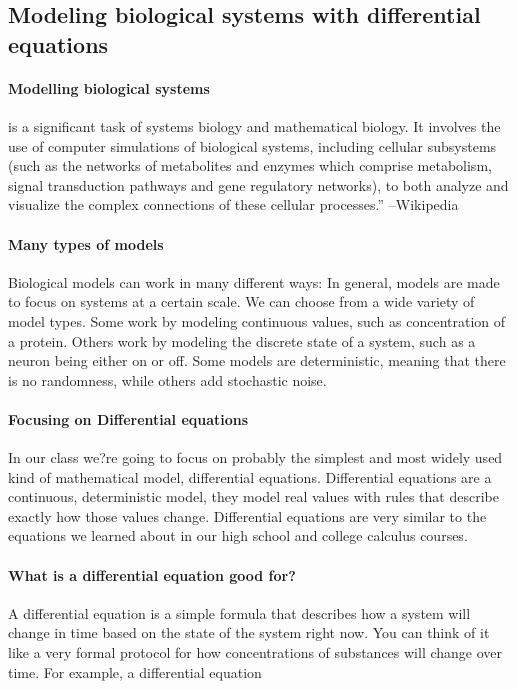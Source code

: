 


\subsection{Modeling biological systems with differential equations}
\paragraph{Modelling biological systems} is a significant task of systems biology and mathematical biology. It involves the use of computer simulations of biological systems, including cellular subsystems (such as the networks of metabolites and enzymes which comprise metabolism, signal transduction pathways and gene regulatory networks), to both analyze and visualize the complex connections of these cellular processes.'' --Wikipedia

\paragraph{Many types of models} Biological models can work in many different ways:  In general, models are made to focus on systems at a certain scale.  We can choose from a wide variety of model types. Some work by modeling continuous values, such as concentration of a protein.  Others work by modeling the discrete state of a system, such as a neuron being either on or off.  Some models are deterministic, meaning that there is no randomness, while others add stochastic noise.

\paragraph{Focusing on Differential equations} In our class we?re going to focus on probably the simplest and most widely used kind of mathematical model, differential equations.  Differential equations are a continuous, deterministic model, they model real values with rules that describe exactly how those values change.  Differential equations are very similar to the equations we learned about in our high school and college calculus courses.

\paragraph{What is a differential equation good for?} A differential equation is a simple formula that describes how a system will change in time based on the state of the system right now. You can think of it like a very formal protocol for how concentrations of substances will change over time.  For example, a differential equation 

